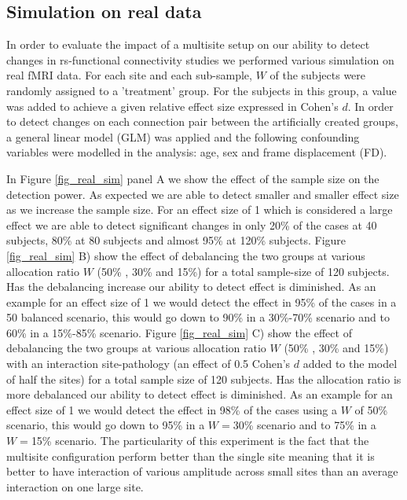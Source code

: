 \documentclass[authoryear]{elsarticle}
\begin{document}
\subsection{Simulation on real data}
In order to evaluate the impact of a multisite setup on our ability to detect changes in rs-functional connectivity studies we performed various simulation on real fMRI data. For each site and each sub-sample, $W$ of the subjects were randomly assigned to a 'treatment' group. For the subjects in this group, a value was added to achieve a given relative effect size expressed in Cohen's $d$. In order to detect changes on each connection pair between the artificially created groups, a general linear model (GLM) was applied and the following confounding variables were modelled in the analysis: age, sex and frame displacement (FD).

In Figure \ref{fig_real_sim} panel A we show the effect of the sample size on the detection power. As expected we are able to detect smaller and smaller effect size as we increase the sample size. For an effect size of 1 which is considered a large effect we are able to detect significant changes in only 20\% of the cases at 40 subjects, 80\% at 80 subjects and almost 95\% at 120\% subjects.
Figure \ref{fig_real_sim} B) show the effect of debalancing the two groups at various allocation ratio $W$ (50\% , 30\% and 15\%) for a total sample-size of 120 subjects. Has the debalancing increase our ability to detect effect is diminished. As an example for an effect size of 1 we would detect the effect in 95\% of the cases in a 50 balanced scenario, this would go down to 90\% in a 30\%-70\% scenario and to 60\% in a 15\%-85\% scenario.
Figure \ref{fig_real_sim} C) show the effect of debalancing the two groups at various allocation ratio $W$ (50\% , 30\% and 15\%) with an interaction site-pathology (an effect of 0.5 Cohen's $d$ added to the model of half the sites) for a total sample size of 120 subjects. Has the allocation ratio is more debalanced our ability to detect effect is diminished. As an example for an effect size of 1 we would detect the effect in 98\% of the cases using a $W$ of 50\% scenario, this would go down to 95\% in a $W=$30\% scenario and to 75\% in a $W=$15\% scenario. The particularity of this experiment is the fact that the multisite configuration perform better than the single site meaning that it is better to have interaction of various amplitude across small sites than an average interaction on one large site.
\end{document}
